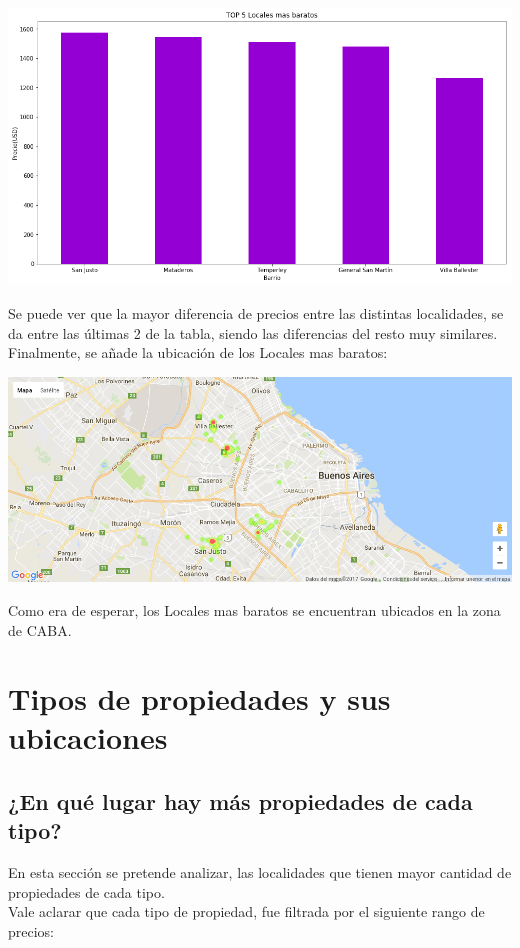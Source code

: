 \documentclass[a4paper, 10pt]{article}
\begin{document}
				\begin{center}
   		    				\includegraphics[width=\textwidth]{images/topLb}
				\end{center}
				
				Se puede ver que la mayor diferencia de precios entre las distintas localidades, se da entre las últimas 2 de la tabla, siendo las diferencias del resto muy similares.\\				
				Finalmente, se añade la ubicación de los Locales mas baratos:
				
				\begin{center}
   		    				\includegraphics[width=\textwidth]{images/ubicLb}
				\end{center}	
				
				Como era de esperar, los Locales mas baratos se encuentran ubicados en la zona de CABA.
				
		
		\section{Tipos de propiedades y sus ubicaciones}
			\subsection{¿En qué lugar hay más propiedades de cada tipo?}
				En esta sección se pretende analizar, las localidades que tienen mayor cantidad de propiedades de cada tipo.\\
				Vale aclarar que cada tipo de propiedad, fue filtrada por el siguiente rango de precios:
				
\end{document}

